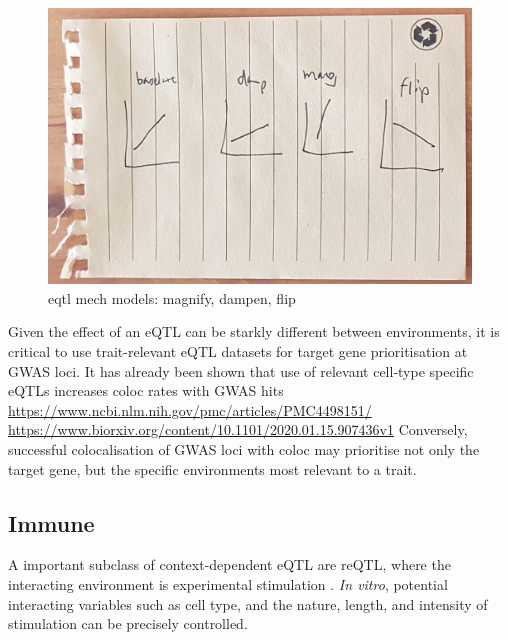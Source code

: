 \begin{outline}
\begin{figure}
    \centering
    \includegraphics[width=1.0\textwidth,page=1]{mainmatter/figures/chapter_01/fig_mockup_reQTLs_Screenshot 2020-05-21 at 17.08.49.png}
    \caption{eqtl mech models: magnify, dampen, flip}
    \label{fig:intro_reQTLmechs}
\end{figure}

\1 Given the effect of an eQTL can be starkly different between environments, it is critical to use trait-relevant \gls{eQTL} datasets for target gene prioritisation at GWAS loci.
    \2 It has already been shown that use of relevant cell-type specific eQTLs increases coloc rates with GWAS hits \autocite{kim-hellmuth2019CellTypeSpecific} \url{https://www.ncbi.nlm.nih.gov/pmc/articles/PMC4498151/} \url{https://www.biorxiv.org/content/10.1101/2020.01.15.907436v1}
    \2 Conversely, successful colocalisation of GWAS loci with coloc may prioritise not only the target gene, but the specific environments most relevant to a trait.

\subsection{Immune }
\label{subsec:intro_reQTL}

\1 A important subclass of context-dependent \gls{eQTL} are \gls{reQTL}, where the interacting environment is experimental stimulation \autocite{vandiedonck2017GeneticAssociationMolecular,huang2019GeneticsGeneExpression}.
    \2 \textit{In vitro}, potential interacting variables such as cell type, and the nature, length, and intensity of stimulation can be precisely controlled.


\end{outline}
